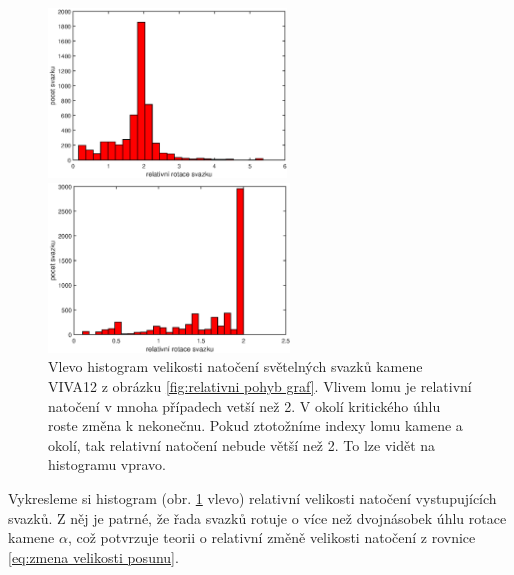 \begin{figure}[h!]
 \begin{center}
 

   \begin{minipage}[c]{0.45\textwidth}
     \centering \includegraphics[height =4.5cm]{figures/relative.eps} 
   \end{minipage}
   \begin{minipage}[c]{0.45\textwidth}
     \centering \includegraphics[height =4.5cm]{figures/relative_index1.eps} 
   \end{minipage}
 \end{center}
\caption{Vlevo histogram velikosti natočení světelných svazků kamene VIVA12 z obrázku \ref{fig:relativni pohyb graf}. Vlivem lomu je relativní natočení v mnoha případech vetší než 2. V okolí kritického úhlu roste změna k nekonečnu. Pokud ztotožníme indexy lomu kamene a okolí, tak relativní natočení nebude větší než 2. To lze vidět na histogramu vpravo.}

\label{fig:histogram relativni pohyb }

\end{figure}

Vykresleme si histogram (obr. \ref{fig:histogram relativni pohyb } vlevo) relativní velikosti natočení vystupujících svazků. Z něj je patrné, že řada svazků rotuje o více než dvojnásobek úhlu rotace kamene $\alpha$, což potvrzuje teorii o relativní změně velikosti natočení z rovnice \ref{eq:zmena velikosti posunu}. 



